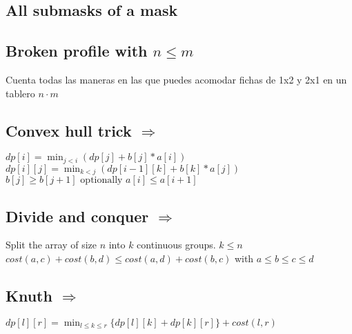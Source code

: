 
\subsection{All submasks of a mask }


\subsection{Broken profile  with $n \leq m$}

Cuenta todas las maneras en las que puedes acomodar fichas de 1x2 y 2x1 en un tablero $n \cdot m$ \\

\subsection{Convex hull trick  $\Rightarrow$ }

$ dp[i] = \min_{j < i}(dp[j] + b[j] * a[i]) $ \\
$ dp[i][j] = \min_{k < j}(dp[i - 1][k] + b[k] * a[j]) $ \\
$ b[j] \geq b[j + 1] \text{ optionally } a[i] \leq a[i + 1] $ \\ 

\subsection{Divide and conquer  $\Rightarrow$ }

Split the array of size $n$ into $k$ continuous groups. $k \leq n$ \\
$ cost(a, c) + cost(b, d) \leq cost(a, d) + cost(b, c)$ with $a \leq b \leq c \leq d$ \\

\subsection{Knuth  $\Rightarrow$ }

$ dp[l][r] = \min_{l \leq k \leq r}\{dp[l][k] + dp[k][r]\} + cost(l, r)$ \\


